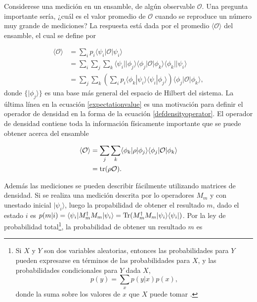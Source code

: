 Considerese una medición en un ensamble, de algún observable $\mathcal{O}$. Una pregunta importante sería, ¿cuál es el valor promedio de $\mathcal{O}$ cuando se reproduce un número muy grande de mediciones? La respuesta está dada por el promedio $\langle \mathcal{O} \rangle$ del ensamble, el cual se define por {\cite{sakurai2017modern}}
 
 \begin{equation}
 	\label{expectationvalue}
 	 \begin{split}
 		\langle \mathcal{O} \rangle &= \sum_{i}p_i \langle\psi_i|\mathcal{O}|\psi_i\rangle\\
 		&=\sum_i\sum_{j}\sum_k \langle\psi_i||\phi_j\rangle \langle \phi_j|\mathcal{O}|\phi_k\rangle \langle \phi_k||\psi_i\rangle\\
 		&=\sum_{j}\sum_k \left(\sum_{i} p_i \langle \phi_k|\psi_i\rangle  \langle\psi_i|\phi_j\rangle\right) \langle \phi_j|\mathcal{O}|\phi_k\rangle, 
 	\end{split}
 \end{equation}
 donde $\{|\phi_j\rangle \}$ es una base más general del espacio de Hilbert del sistema. La última línea en la ecuación {\ref{expectationvalue}} es una motivación para  definir el operador de densidad  en la forma de la ecuación {\ref{defdensityoperator}}. El operador de densidad contiene toda la información físicamente importante que se puede obtener acerca del ensamble {\cite{sakurai2017modern}} 
 
 
 
  \begin{equation}
 	\label{expectationvalue_traza}
 	\begin{split}
 		\langle \mathcal{O} \rangle &=\sum_{j}\sum_k \langle \phi_k|\rho|\phi_j\rangle \langle \phi_j|\mathcal{O}|\phi_k\rangle\\
 		&= \rm{tr}(\rho \mathcal{O}).
 	\end{split}
 \end{equation}

	Además las mediciones se pueden describir fácilmente utilizando matrices de densidad. Si se realiza una medición descrita por lo operadores $M_m$ y con unestado inicial $|\psi_i\rangle$, luego la propabilidad de obtener el resultado $m$, dado el estado $i$ es $p(m|i)=\langle \psi_i|M_m^{\dagger}M_m|\psi_i\rangle = {\rm Tr}(M_m^{\dagger} M_m |\psi_i\rangle \langle\psi_i|)$. Por la ley de probabilidad total\footnote{Si  $X$ y $Y$ son dos variables aleatorias, entonces las probabilidades para $Y $ pueden expresarse en términos de las probabilidades para $X$, y las probabilidades condicionales para $ Y$ dada $X$,
		\[p(y) =\sum_x p(y|x)p(x),\] donde la suma sobre los valores de $x$ que $X$ puede tomar {\cite{nielsen_chuang_2010}}.}, la probabilidad de obtener un resultado $m$ es {\cite{nielsen_chuang_2010}}


